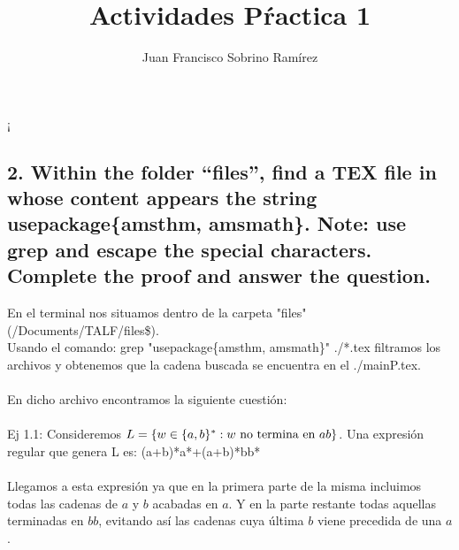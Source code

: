 \documentclass[20pt,oneside]{extbook}
\title{\Huge {Actividades Pŕactica 1}}
\author{Juan Francisco Sobrino Ramírez}
\date{}
\begin{document}
\maketitle

\newpage 
¡


\subsection*{2. Within the folder “files”, find a TEX file in whose content appears the string usepackage\{amsthm, amsmath\}. Note: use grep and escape the special characters.\\Complete the proof and answer the question.}
 
 En el terminal nos situamos dentro de la carpeta "files" (/Documents/TALF/files\$). \\
 Usando el comando: grep "usepackage\{amsthm, amsmath\}" ./*.tex filtramos los archivos y obtenemos que la cadena buscada se encuentra en el ./mainP.tex.\\
\\
En dicho archivo encontramos la siguiente cuestión:\\ 
\\
Ej 1.1: Consideremos $L=\{w\in \{a,b\}^* : w \textnormal{ no termina en } ab\}$. Una expresión regular que genera L es: (a+b)*a*+(a+b)*bb* \\
\\
Llegamos a esta expresión ya que en la primera parte de la misma incluimos todas las cadenas de $a$ y $b$ acabadas en $a$.  Y en la parte restante todas aquellas terminadas en $bb$, evitando así las cadenas cuya última $b$ viene precedida de una $a$.
\end{document}
